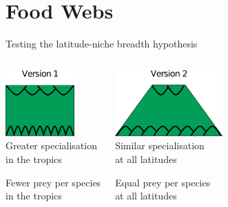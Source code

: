 \documentclass{beamer}
\begin{document}
\section*{Food Webs}
  \begin{frame}{Testing the latitude-niche breadth hypothesis}
    \begin{columns}
    \column{.5in}
    \column{1.75in}
      \begin{center}
      \includegraphics[height=1in]{Figures/version1.eps}\\
      \vspace{.5cm}
      Greater specialisation\\in the tropics

      \vspace{.25cm}
      {\color{white}Fewer prey per species\\in the tropics}

      \end{center}
    \column{.5in}
    \column{1.75in}
      \begin{center}
      \includegraphics[height=1in]{Figures/version2.eps}\\
      \vspace{.5cm}
      Similar specialisation\\at all latitudes

      \vspace{.25cm}
      {\color{white}Equal prey per species\\at all latitudes}

      \end{center}
    \column{.5in}
    \end{columns}

    \vspace{.5cm}

    \begin{center}
      \color{white}{Generality : mean number of prey per species}
    \end{center}
  \end{frame}
\end{document}
